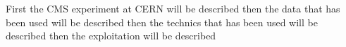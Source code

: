 
First the CMS experiment at CERN will be described
then the data that has been used will be described
then the technics that has been used will be described
then the exploitation will be described 

